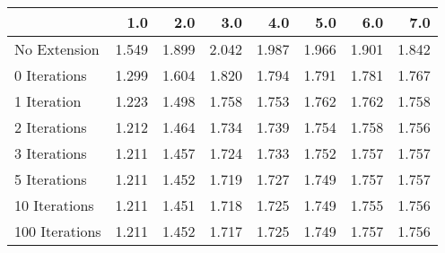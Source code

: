 \begin{tabular}{lrrrrrrr}
\toprule
{} &   1.0 &   2.0 &   3.0 &   4.0 &   5.0 &   6.0 &   7.0 \\
\midrule
No Extension   & 1.549 & 1.899 & 2.042 & 1.987 & 1.966 & 1.901 & 1.842 \\
0 Iterations   & 1.299 & 1.604 & 1.820 & 1.794 & 1.791 & 1.781 & 1.767 \\
1 Iteration    & 1.223 & 1.498 & 1.758 & 1.753 & 1.762 & 1.762 & 1.758 \\
2 Iterations   & 1.212 & 1.464 & 1.734 & 1.739 & 1.754 & 1.758 & 1.756 \\
3 Iterations   & 1.211 & 1.457 & 1.724 & 1.733 & 1.752 & 1.757 & 1.757 \\
5 Iterations   & 1.211 & 1.452 & 1.719 & 1.727 & 1.749 & 1.757 & 1.757 \\
10 Iterations  & 1.211 & 1.451 & 1.718 & 1.725 & 1.749 & 1.755 & 1.756 \\
100 Iterations & 1.211 & 1.452 & 1.717 & 1.725 & 1.749 & 1.757 & 1.756 \\
\bottomrule
\end{tabular}
